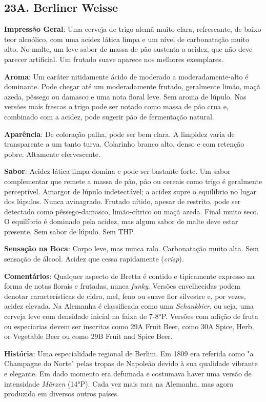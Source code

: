 \subsection*{23A. Berliner Weisse}
\textbf{Impressão Geral}: Uma cerveja de trigo alemã muito clara, refrescante, de baixo teor alcoólico, com uma acidez lática limpa e um nível de carbonatação muito alto. No malte, um leve sabor de massa de pão sustenta a acidez, que não deve parecer artificial. Um frutado suave aparece nos melhores exemplares.

\textbf{Aroma}: Um caráter nitidamente ácido de moderado a moderadamente-alto é dominante. Pode chegar até um moderadamente frutado, geralmente limão, maçã azeda, pêssego ou damasco e uma nota floral leve. Sem aroma de lúpulo. Nas versões mais frescas o trigo pode ser notado como massa de pão crua e, combinado com a acidez, pode sugerir pão de fermentação natural.

\textbf{Aparência}: De coloração palha, pode ser bem clara. A limpidez varia de transparente a um tanto turva. Colarinho branco alto, denso e com retenção pobre. Altamente efervescente.

\textbf{Sabor}: Acidez lática limpa domina e pode ser bastante forte. Um sabor complementar que remete a massa de pão, pão ou cereais como trigo é geralmente perceptível. Amargor de lúpulo indetectável; a acidez supre o equilíbrio no lugar dos lúpulos. Nunca avinagrado. Frutado nítido, apesar de restrito, pode ser detectado como pêssego-damasco, limão-cítrico ou maçã azeda. Final muito seco. O equilíbrio é dominado pela acidez, mas algum sabor de malte deve estar presente. Sem sabor de lúpulo. Sem THP.

\textbf{Sensação na Boca}: Corpo leve, mas nunca ralo. Carbonatação muito alta. Sem sensação de álcool. Acidez que cessa rapidamente (\textit{crisp}).

\textbf{Comentários}: Qualquer aspecto de Bretta é contido e tipicamente expresso na forma de notas florais e frutadas, nunca \textit{funky}. Versões envelhecidas podem denotar características de cidra, mel, feno ou suave flor silvestre e, por vezes, acidez elevada. Na Alemanha é classificada como uma \textit{Schankbier}, ou seja, uma cerveja leve com densidade inicial na faixa de 7-8°P. Versões com adição de fruta ou especiarias devem ser inscritas como 29A Fruit Beer, como 30A Spice, Herb, or Vegetable Beer ou como 29B Fruit and Spice Beer.

\textbf{História}: Uma especialidade regional de Berlim. Em 1809 era referida como "a Champagne do Norte" pelas tropas de Napoleão devido à sua qualidade vibrante e elegante. Em dado momento era defumada e costumava haver uma versão de intensidade \textit{Märzen} (14°P). Cada vez mais rara na Alemanha, mas agora produzida em diversos outros países.

